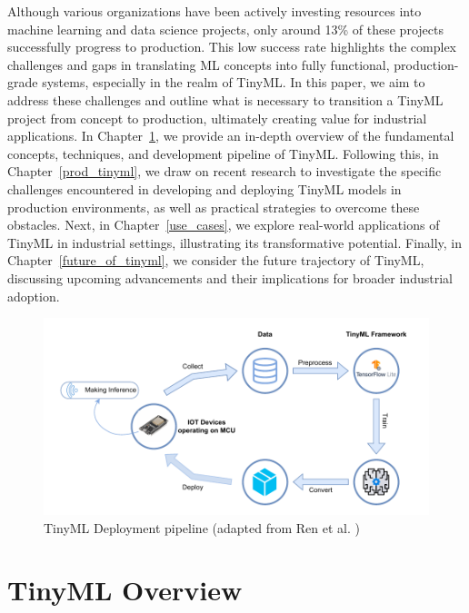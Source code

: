 \documentclass[twocolumn]{article}
\begin{document}
Although various organizations have been actively investing resources into machine learning and data science projects, only around 13\% of these projects successfully progress to production.\footnotemark {} 
This low success rate highlights the complex challenges and gaps in translating ML concepts into fully functional, production-grade systems, especially in the realm of TinyML. In this paper, we aim to address these challenges and outline what is necessary to transition a TinyML project from concept to production, ultimately creating value for industrial applications. In Chapter~\ref{tinyml_overview}, we provide an in-depth overview of the fundamental concepts, techniques, and development pipeline of TinyML. Following this, in Chapter~\ref{prod_tinyml}, we draw on recent research to investigate the specific challenges encountered in developing and deploying TinyML models in production environments, as well as practical strategies to overcome these obstacles. Next, in Chapter~\ref{use_cases}, we explore real-world applications of TinyML in industrial settings, illustrating its transformative potential. Finally, in Chapter~\ref{future_of_tinyml}, we consider the future trajectory of TinyML, discussing upcoming advancements and their implications for broader industrial adoption.
\begin{figure}
	\centerline{
	\includegraphics[width=1\columnwidth,height=0.23\textheight]{resource/tinyml_deployment.pdf}
	}
	\caption{TinyML Deployment pipeline (adapted from Ren et al. \cite{ren_tinyol_2021})}
	\label{TUM}
\end{figure}

\section{TinyML Overview} 
\label{tinyml_overview}
\end{document}
